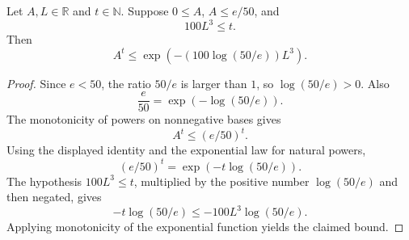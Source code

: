 \begin{lemma}
Let \(A,L\in\mathbb R\) and \(t\in\mathbb N\).  Suppose \(0\le A\), \(A\le e/50\), and
\[
  100L^3\le t.
\]
Then
\[
  A^t\le \exp\!\left(-(100\log(50/e))L^3\right).
\]
\end{lemma}
\begin{proof}
Since \(e<50\), the ratio \(50/e\) is larger than \(1\), so
\(\log(50/e)>0\).  Also
\[
  \frac e{50}=\exp(-\log(50/e)).
\]
The monotonicity of powers on nonnegative bases gives
\[
  A^t\le (e/50)^t.
\]
Using the displayed identity and the exponential law for natural powers,
\[
  (e/50)^t=\exp(-t\log(50/e)).
\]
The hypothesis \(100L^3\le t\), multiplied by the positive number
\(\log(50/e)\) and then negated, gives
\[
  -t\log(50/e)\le -100L^3\log(50/e).
\]
Applying monotonicity of the exponential function yields the claimed bound.
\end{proof}
